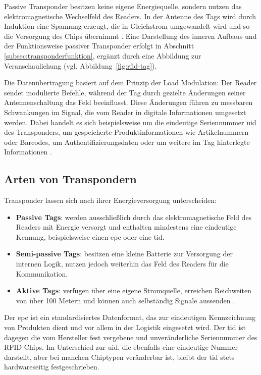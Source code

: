 Passive Transponder besitzen keine eigene Energiequelle, sondern nutzen das elektromagnetische Wechselfeld des Readers. 
In der Antenne des Tags wird durch Induktion eine Spannung erzeugt, die in Gleichstrom umgewandelt wird und so die Versorgung des Chips übernimmt \cite{Conrad:2024a}. 
Eine Darstellung des inneren Aufbaus und der Funktionsweise passiver Transponder erfolgt in Abschnitt \ref{subsec:transponderfunktion}, ergänzt durch eine Abbildung zur Veranschaulichung (vgl. Abbildung~\ref{fig:rfid-tag}). 




Die Datenübertragung basiert auf dem Prinzip der Load Modulation: 
Der Reader sendet modulierte Befehle, während der Tag durch gezielte Änderungen seiner Antennenschaltung das Feld beeinflusst. 
Diese Änderungen führen zu messbaren Schwankungen im Signal, die vom Reader in digitale Informationen umgesetzt werden. 
Dabei handelt es sich beispielsweise um die eindeutige Seriennummer \ac{uid} des Transponders, um gespeicherte Produktinformationen wie Artikelnummern oder Barcodes, um Authentifizierungsdaten oder um weitere im Tag hinterlegte Informationen \cite{Heuermann:2023,Conrad:2024a}.

\subsection{Arten von Transpondern}\label{transpondertypen}

Transponder lassen sich nach ihrer Energieversorgung unterscheiden:

\begin{itemize}
	
	
	\item \textbf{Passive Tags}: werden ausschließlich durch das elektromagnetische Feld des Readers mit Energie versorgt und enthalten mindestens eine eindeutige Kennung, beispielsweise einen \ac{epc} oder eine \ac{tid}.
 
	\item \textbf{Semi-passive Tags}: besitzen eine kleine Batterie zur Versorgung der internen Logik, nutzen jedoch weiterhin das Feld des Readers für die Kommunikation.  
	\item \textbf{Aktive Tags}: verfügen über eine eigene Stromquelle, erreichen Reichweiten von über 100 Metern und können auch selbständig Signale aussenden \cite{Conrad:2024a}. 
	
	
\end{itemize}


Der \ac{epc} ist ein standardisiertes Datenformat, das zur eindeutigen Kennzeichnung von Produkten dient und vor allem in der Logistik eingesetzt wird.
Der \ac{tid} ist dagegen die vom Hersteller fest vergebene und unveränderliche Seriennummer des RFID-Chips. 
Im Unterschied zur \ac{uid}, die ebenfalls eine eindeutige Nummer darstellt, aber bei manchen Chiptypen veränderbar ist, bleibt der \ac{tid} stets hardwareseitig festgeschrieben.

